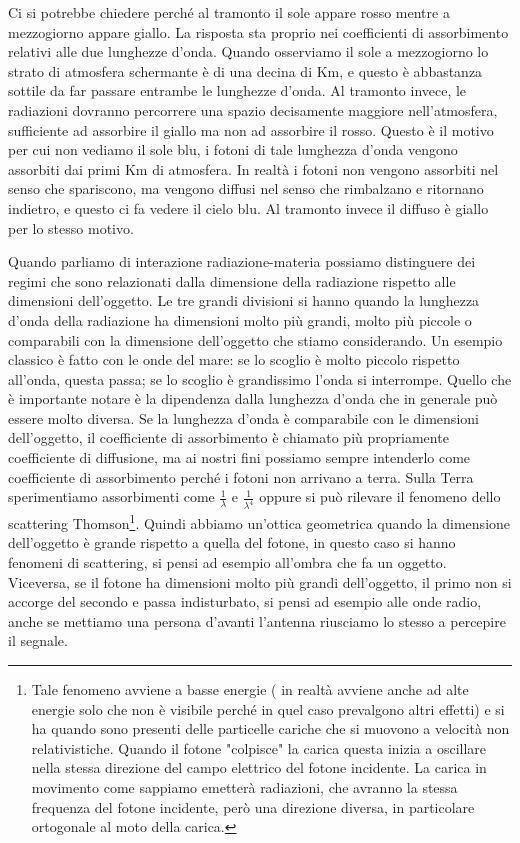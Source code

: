 \documentclass[a4paper,11pt]{article}
\begin{document}
    Ci si potrebbe chiedere perché al tramonto il sole appare rosso mentre a mezzogiorno appare giallo. La risposta sta proprio nei coefficienti di assorbimento relativi alle due lunghezze d'onda. Quando osserviamo il sole a mezzogiorno lo strato di atmosfera schermante è di una decina di Km, e questo è abbastanza sottile da far passare entrambe le lunghezze d'onda. Al tramonto invece, le radiazioni dovranno percorrere una spazio decisamente maggiore nell'atmosfera, sufficiente ad assorbire il giallo ma non ad assorbire il rosso. Questo è il motivo per cui non vediamo il sole blu, i fotoni di tale lunghezza d'onda vengono assorbiti dai primi Km di atmosfera. In realtà i fotoni non vengono assorbiti nel senso che spariscono, ma vengono diffusi nel senso che rimbalzano e ritornano indietro, e questo ci fa vedere il cielo blu. Al tramonto invece il diffuso è giallo per lo stesso motivo.

    Quando parliamo di interazione radiazione-materia possiamo distinguere dei regimi che sono relazionati dalla dimensione della radiazione rispetto alle dimensioni dell'oggetto. Le tre grandi divisioni si hanno quando la lunghezza d'onda della radiazione ha dimensioni  molto più grandi, molto più piccole o comparabili con la dimensione dell'oggetto che stiamo considerando. Un esempio classico è fatto con le onde del mare: se lo scoglio è molto piccolo rispetto all'onda, questa passa; se lo scoglio è grandissimo l'onda si interrompe. Quello che è importante notare è la dipendenza dalla lunghezza d'onda che in generale può essere molto diversa. Se la lunghezza d'onda è comparabile con le dimensioni dell'oggetto, il coefficiente di assorbimento è chiamato più propriamente coefficiente di diffusione, ma ai nostri fini possiamo sempre intenderlo come coefficiente di assorbimento perché i fotoni non arrivano a terra. Sulla Terra sperimentiamo assorbimenti come $\frac{1}{\lambda}$ e $\frac{1}{\lambda^4}$ oppure si può rilevare il fenomeno dello scattering Thomson\footnote{Tale fenomeno avviene a basse energie ( in realtà avviene anche ad alte energie solo che non è visibile perché in quel caso prevalgono altri effetti) e si ha quando sono presenti delle particelle cariche che si muovono a velocità non relativistiche. Quando il fotone "colpisce" la carica questa inizia a oscillare nella stessa direzione del campo elettrico del fotone incidente. La carica in movimento come sappiamo emetterà radiazioni, che avranno la stessa frequenza del fotone incidente, però una direzione diversa, in particolare ortogonale al moto della carica.}. Quindi abbiamo un'ottica geometrica quando la dimensione dell'oggetto è grande rispetto a quella del fotone, in questo caso si hanno fenomeni di scattering, si pensi ad esempio all'ombra che fa un oggetto. Viceversa, se il fotone ha dimensioni molto più grandi dell'oggetto, il primo non si accorge del secondo e passa indisturbato, si pensi ad esempio alle onde radio, anche se mettiamo una persona d'avanti l'antenna riusciamo lo stesso a percepire il segnale.
\end{document}

